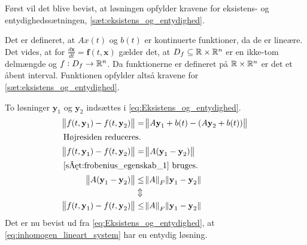 \begin{bev} \textbf{} %
\newline
Først vil det blive bevist, at løsningen opfylder kravene for eksistens- og entydighedssætningen, \autoref{sæt:eksistens_og_entydighed}. 

Det er defineret, at $Ax(t)$ og $b(t)$ er kontinuerte funktioner, da de er lineære. Det vides, at for
$\displaystyle \frac{d\textbf{x}}{dt}=\textbf{f}(t,\textbf{x})$ gælder det, at $D_f \subseteq \mathbb{R} \times \mathbb{R}^n$ er en ikke-tom delmængde og $f: D_f \to \mathbb{R}^n$. Da funktionerne er defineret på $\mathbb{R} \times \mathbb{R}^{n}$ er det et åbent interval. Funktionen opfylder altså kravene for  \autoref{sæt:eksistens_og_entydighed}.

To løsninger $\textbf{y}_1$ og $\textbf{y}_2$ indsættes i \eqref{eq:Eksistens_og_entydighed}.
%
\begin{align*}
    \norm{f(t, \textbf{y}_1)-f(t, \textbf{y}_2)}
    &=\norm{A\textbf{y}_1+b(t)-(A\textbf{y}_2+b(t))}\\
    \intertext{Højresiden reduceres.}
    \norm{f(t, \textbf{y}_1)-f(t, \textbf{y}_2)}&=\norm{A(\textbf{y}_1-\textbf{y}_2)}\\
    \intertext{\autoref{sæt:frobenius_egenskab_1} bruges.}
    \norm{A(\textbf{y}_1-\textbf{y}_2)}&\leq\norm A _F \norm{\textbf{y}_1-\textbf{y}_2}\\
    &\Updownarrow\\
    \norm{f(t, \textbf{y}_1)-f(t, \textbf{y}_2)}&\leq \norm A _F \norm{\textbf{y}_1-\textbf{y}_2}
\end{align*}
Det er nu bevist ud fra \eqref{eq:Eksistens_og_entydighed}, at \eqref{eq:inhomogen_lineart_system} har en entydig løsning.


\end{bev}
